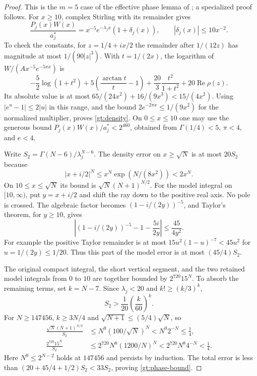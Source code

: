 \begin{proof}
This is the $m=5$ case of the effective phase lemma of
\cite{PolygammaResonances}; a specialized proof follows.
For $x\ge10$, complex Stirling with its remainder \cite[\S5.11(ii)]{DLMF}
gives
\begin{equation}\label{gt:density}
 \frac{P_j(x)W(x)}{a_j^*}
 =x^{-5}e^{-\lambda_jx}(1+\delta_j(x)),\qquad
                      |\delta_j(x)|\le10x^{-2}.
\end{equation}
To check the constants, for $z=1/4+ix/2$ the remainder after
$1/(12z)$ has magnitude at most $1/(90|z|^3)$. With $t=1/(2x)$,
the logarithm of $W/(Ax^{-5}e^{-5\pi x})$ is
\[
 -\frac52\log(1+t^2)
 +5\left(\frac{\arctan t}{t}-1\right)
 +\frac{20}{3}\frac{t^2}{1+t^2}+20\operatorname{Re}\rho(z).
\]
Its absolute value is at most
$65/(24x^2)+16/(9x^3)<15/(4x^2)$.
Using $|e^u-1|\le2|u|$ in this range, and the bound
$2e^{-2\pi x}\le1/(9x^2)$ for the normalized multiplier, proves
\eqref{gt:density}. On $0\le x\le10$ one may use the generous
bound $P_j(x)W(x)/a_j^*<2^{460}$, obtained from
$\Gamma(1/4)<5$, $\pi<4$, and $e<4$.

Write $S_2=\Gamma(N-6)/\lambda_j^{N-6}$.
The density error on $x\ge\sqrt N$ is at most $20S_2$ because
\[
 |x+i/2|^N\le x^N\exp(N/(8x^2))<2x^N.
\]
On $10\le x\le\sqrt N$ its bound is
$\sqrt N(N+1)^{N/2}$.
For the model integral on $[10,\infty)$, put $y=x+i/2$ and
shift the ray down to the positive real axis. No pole is crossed.
The algebraic factor becomes $(1-i/(2y))^{-5}$, and Taylor's
theorem, for $y\ge10$, gives
\[
 \left|(1-i/(2y))^{-5}-1-\frac{5i}{2y}\right|
                         \le\frac{45}{4y^2}.
\]
For example the positive Taylor remainder is at most
$15u^2(1-u)^{-7}<45u^2$ for $u=1/(2y)\le1/20$.
Thus this part of the model error is at most $(45/4)S_2$.

The original compact integral, the short vertical segment, and the
two retained model integrals from $0$ to $10$ are together bounded
by $2^{720}15^N$. To absorb the remaining terms, set $k=N-7$.
Since $\lambda_j<20$ and $k!\ge(k/3)^k$,
\[
 S_2>\frac1{20}\left(\frac{k}{60}\right)^k.
\]
For $N\ge147456$, $k\ge3N/4$ and
$\sqrt{N+1}\le(5/4)\sqrt N$, so
\begin{align*}
 \frac{\sqrt N(N+1)^{N/2}}{S_2}
     &\le N^9(100/\sqrt N)^N<N^9 2^{-N}\le\tfrac14,\\
 \frac{2^{720}15^N}{S_2}
     &\le2^{720}N^8(1200/N)^N
                  <2^{720}N^8 4^{-N}<\tfrac14.
\end{align*}
Here $N^9\le2^{N-2}$ holds at $147456$ and persists by induction.
The total error is less than
$(20+45/4+1/2)S_2<33S_2$, proving \eqref{gt:phase-bound}.
\end{proof}

